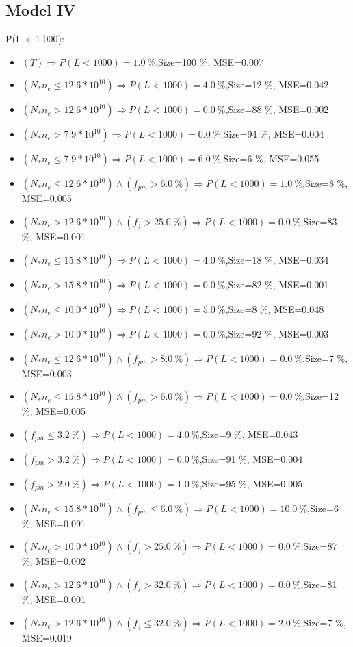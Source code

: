 \documentclass[numbered]{CSL}
\begin{document}
\subsection{Model IV}
P(L < 1 000):
\begin{itemize}
\item $(T) \Rightarrow P(L < 1 000) = 1.0~\%$,\hfill Size=100 \%, MSE=0.007
\item $(N_* n_e \leq 12.6 * 10^{10}) \Rightarrow P(L < 1 000) = 4.0~\%$,\hfill Size=12 \%, MSE=0.042
\item $(N_* n_e > 12.6 * 10^{10}) \Rightarrow P(L < 1 000) = 0.0~\%$,\hfill Size=88 \%, MSE=0.002
\item $(N_* n_e > 7.9 * 10^{10}) \Rightarrow P(L < 1 000) = 0.0~\%$,\hfill Size=94 \%, MSE=0.004
\item $(N_* n_e \leq 7.9 * 10^{10}) \Rightarrow P(L < 1 000) = 6.0~\%$,\hfill Size=6 \%, MSE=0.055
\item $(N_* n_e \leq 12.6 * 10^{10}) \land (f_{pm} > 6.0~\%) \Rightarrow P(L < 1 000) = 1.0~\%$,\hfill Size=8 \%, MSE=0.005
\item $(N_* n_e > 12.6 * 10^{10}) \land (f_j > 25.0~\%) \Rightarrow P(L < 1 000) = 0.0~\%$,\hfill Size=83 \%, MSE=0.001
\item $(N_* n_e \leq 15.8 * 10^{10}) \Rightarrow P(L < 1 000) = 4.0~\%$,\hfill Size=18 \%, MSE=0.034
\item $(N_* n_e > 15.8 * 10^{10}) \Rightarrow P(L < 1 000) = 0.0~\%$,\hfill Size=82 \%, MSE=0.001
\item $(N_* n_e \leq 10.0 * 10^{10}) \Rightarrow P(L < 1 000) = 5.0~\%$,\hfill Size=8 \%, MSE=0.048
\item $(N_* n_e > 10.0 * 10^{10}) \Rightarrow P(L < 1 000) = 0.0~\%$,\hfill Size=92 \%, MSE=0.003
\item $(N_* n_e \leq 12.6 * 10^{10}) \land (f_{pm} > 8.0~\%) \Rightarrow P(L < 1 000) = 0.0~\%$,\hfill Size=7 \%, MSE=0.003
\item $(N_* n_e \leq 15.8 * 10^{10}) \land (f_{pm} > 6.0~\%) \Rightarrow P(L < 1 000) = 0.0~\%$,\hfill Size=12 \%, MSE=0.005
\item $(f_{pm} \leq 3.2~\%) \Rightarrow P(L < 1 000) = 4.0~\%$,\hfill Size=9 \%, MSE=0.043
\item $(f_{pm} > 3.2~\%) \Rightarrow P(L < 1 000) = 0.0~\%$,\hfill Size=91 \%, MSE=0.004
\item $(f_{pm} > 2.0~\%) \Rightarrow P(L < 1 000) = 1.0~\%$,\hfill Size=95 \%, MSE=0.005
\item $(N_* n_e \leq 15.8 * 10^{10}) \land (f_{pm} \leq 6.0~\%) \Rightarrow P(L < 1 000) = 10.0~\%$,\hfill Size=6 \%, MSE=0.091
\item $(N_* n_e > 10.0 * 10^{10}) \land (f_j > 25.0~\%) \Rightarrow P(L < 1 000) = 0.0~\%$,\hfill Size=87 \%, MSE=0.002
\item $(N_* n_e > 12.6 * 10^{10}) \land (f_j > 32.0~\%) \Rightarrow P(L < 1 000) = 0.0~\%$,\hfill Size=81 \%, MSE=0.001
\item $(N_* n_e > 12.6 * 10^{10}) \land (f_j \leq 32.0~\%) \Rightarrow P(L < 1 000) = 2.0~\%$,\hfill Size=7 \%, MSE=0.019
\end{itemize}
\end{document}
